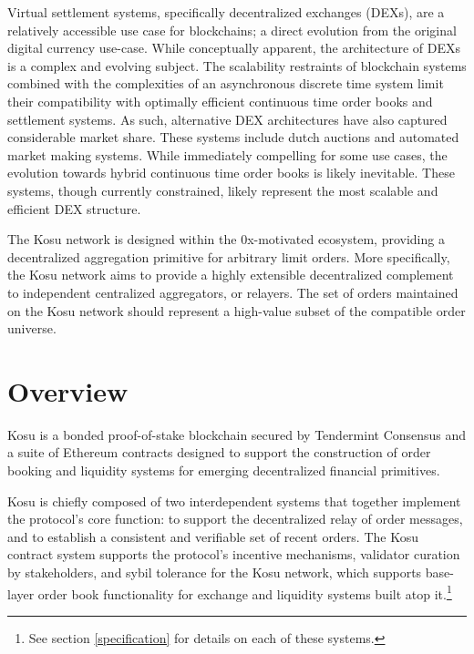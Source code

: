 \documentclass[10pt]{article}
\begin{document}
Virtual settlement systems, specifically decentralized exchanges (DEXs), are a relatively accessible use case for blockchains; a direct evolution from the original digital currency use-case. While conceptually apparent, the architecture of DEXs is a complex and evolving subject. The scalability restraints of blockchain systems combined with the complexities of an asynchronous discrete time system limit their compatibility with optimally efficient continuous time order books and settlement systems. As such, alternative DEX architectures have also captured considerable market share. These systems include dutch auctions and automated market making systems. While immediately compelling for some use cases, the evolution towards hybrid continuous time order books is likely inevitable. These systems, though currently constrained, likely represent the most scalable and efficient DEX structure.
\medskip

The Kosu network is designed within the 0x-motivated ecosystem, providing a decentralized aggregation primitive for arbitrary limit orders. More specifically, the Kosu network aims to provide a highly extensible decentralized complement to independent centralized aggregators, or relayers. The set of orders maintained on the Kosu network should represent a high-value subset of the compatible order universe.

\clearpage
\pagebreak


\section{Overview}\label{overview}
Kosu is a bonded proof-of-stake blockchain secured by Tendermint Consensus\cite{tendermint} and a suite of Ethereum contracts designed to support the construction of order booking and liquidity systems for emerging decentralized financial primitives.
\medskip

Kosu is chiefly composed of two interdependent systems that together implement the protocol’s core function: to support the decentralized relay of order messages, and to establish a consistent and verifiable set of recent orders. The Kosu contract system supports the protocol's incentive mechanisms, validator curation by stakeholders, and sybil tolerance for the Kosu network, which supports base-layer order book functionality for exchange and liquidity systems built atop it.\footnote{See section \ref{specification} for details on each of these systems.}
\medskip
\end{document}
